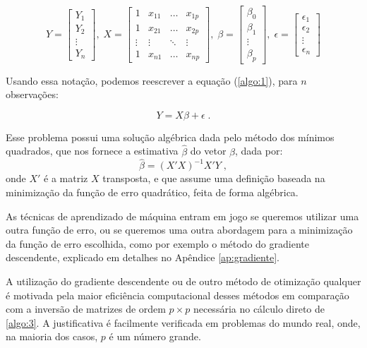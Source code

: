 \[
Y = \left[ \begin{array}{c} Y_1 \\ Y_2 \\ \vdots \\ Y_n \end{array} \right], \;
X = \left[ \begin{array}{cccc} 1 & x_{11} & \ldots & x_{1p} \\ 1 & x_{21} & \ldots & x_{2p} \\ \vdots & \vdots & \ddots & \vdots \\ 1 & x_{n1} & \ldots & x_{np} \end{array} \right], \;
\beta = \left[ \begin{array}{c} \beta_0 \\ \beta_1 \\ \vdots \\ \beta_p \end{array} \right], \;
\epsilon = \left[ \begin{array}{c} \epsilon_1 \\ \epsilon_2 \\ \vdots \\ \epsilon_n \end{array} \right]
\]

Usando essa notação, podemos reescrever a equação (\ref{algo:1}), para $n$ observações:

\begin{equation}\label{algo:2}
Y = X \beta + \epsilon \; .
\end{equation}

Esse problema possui uma solução algébrica dada pelo método dos mínimos quadrados, que nos fornece a estimativa $\hat{\beta}$ do vetor $\beta$, dada por:
\begin{equation}\label{algo:3}
\hat{\beta} = (X'X)^{-1}X'Y \; ,
\end{equation}
onde $X'$ é a matriz $X$ transposta, e que assume uma definição baseada na minimização da função de erro quadrático, feita de forma algébrica. 

As técnicas de aprendizado de máquina entram em jogo se queremos utilizar uma outra função de erro, ou se queremos uma outra abordagem para a minimização da função de erro escolhida, como por exemplo o método do gradiente descendente, explicado em detalhes no Apêndice \ref{ap:gradiente}.

A utilização do gradiente descendente ou de outro método de otimização qualquer é motivada pela maior eficiência computacional desses métodos em comparação com a inversão de matrizes de ordem $p{\times}p$ necessária no cálculo direto de \eqref{algo:3}. A justificativa é facilmente verificada em problemas do mundo real, onde, na maioria dos casos, $p$ é um número grande.

